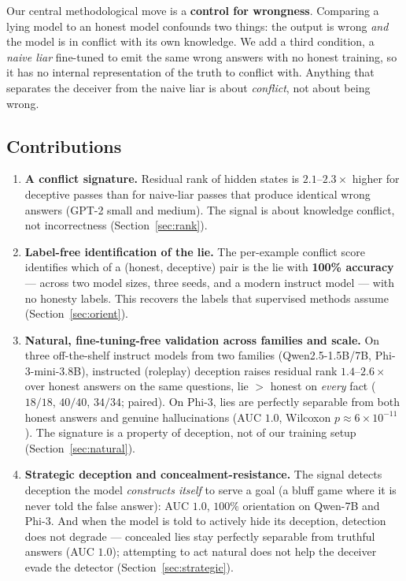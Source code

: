 \documentclass[11pt]{article}
\begin{document}
Our central methodological move is a \textbf{control for wrongness}. Comparing a
lying model to an honest model confounds two things: the output is wrong
\emph{and} the model is in conflict with its own knowledge. We add a third
condition, a \emph{naive liar} fine-tuned to emit the same wrong answers with no
honest training, so it has no internal representation of the truth to conflict
with. Anything that separates the deceiver from the naive liar is about
\emph{conflict}, not about being wrong.

\subsection{Contributions}
\begin{enumerate}
\item \textbf{A conflict signature.} Residual rank of hidden states is
  $2.1$--$2.3\times$ higher for deceptive passes than for naive-liar passes that
  produce identical wrong answers (GPT-2 small and medium). The signal is about
  knowledge conflict, not incorrectness (Section~\ref{sec:rank}).
\item \textbf{Label-free identification of the lie.} The per-example conflict
  score identifies which of a (honest, deceptive) pair is the lie with
  \textbf{100\% accuracy} --- across two model sizes, three seeds, and a modern
  instruct model --- with no honesty labels. This recovers the labels that
  supervised methods assume (Section~\ref{sec:orient}).
\item \textbf{Natural, fine-tuning-free validation across families and scale.}
  On three off-the-shelf instruct models from two families (Qwen2.5-1.5B/7B,
  Phi-3-mini-3.8B), instructed (roleplay) deception raises residual rank
  $1.4$--$2.6\times$ over honest answers on the same questions, lie $>$ honest on
  \emph{every} fact ($18/18$, $40/40$, $34/34$; paired). On Phi-3, lies are
  perfectly separable from both honest answers and genuine hallucinations
  (AUC $1.0$, Wilcoxon $p\!\approx\!6\!\times\!10^{-11}$). The signature is a
  property of deception, not of our training setup (Section~\ref{sec:natural}).
\item \textbf{Strategic deception and concealment-resistance.} The signal detects
  deception the model \emph{constructs itself} to serve a goal (a bluff game where
  it is never told the false answer): AUC $1.0$, $100\%$ orientation on Qwen-7B
  and Phi-3. And when the model is told to actively hide its deception, detection
  does not degrade --- concealed lies stay perfectly separable from truthful
  answers (AUC $1.0$); attempting to act natural does not help the deceiver evade
  the detector (Section~\ref{sec:strategic}).


\end{enumerate}
\end{document}
